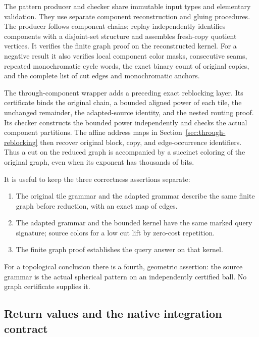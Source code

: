The pattern producer and checker share immutable input types and elementary
validation. They use separate component reconstruction and gluing procedures.
The producer follows component chains; replay independently identifies
components with a disjoint-set structure and assembles fresh-copy quotient
vertices. It verifies the finite graph proof on the reconstructed kernel.
For a negative result it also verifies local component color masks, consecutive
seams, repeated monochromatic cycle words, the exact binary count of original
copies, and the complete list of cut edges and monochromatic anchors.

The through-component wrapper adds a preceding exact reblocking layer. Its
certificate binds the original chain, a bounded aligned power of each tile,
the unchanged remainder, the adapted-source identity, and the nested routing
proof. Its checker constructs the bounded power independently and checks the
actual component partitions. The affine address maps in
Section~\ref{sec:through-reblocking} then recover original block, copy, and
edge-occurrence identifiers. Thus a cut on the reduced graph is accompanied
by a succinct coloring of the original graph, even when its exponent has
thousands of bits.

It is useful to keep the three correctness assertions separate:
\begin{enumerate}
\item The original tile grammar and the adapted grammar describe the same
finite graph before reduction, with an exact map of edges.
\item The adapted grammar and the bounded kernel have the same marked query
signature; source colors for a low cut lift by zero-cost repetition.
\item The finite graph proof establishes the query answer on that kernel.
\end{enumerate}
For a topological conclusion there is a fourth, geometric assertion: the
source grammar is the actual spherical pattern on an independently certified
ball. No graph certificate supplies it.

\subsection{Return values and the native integration contract}

